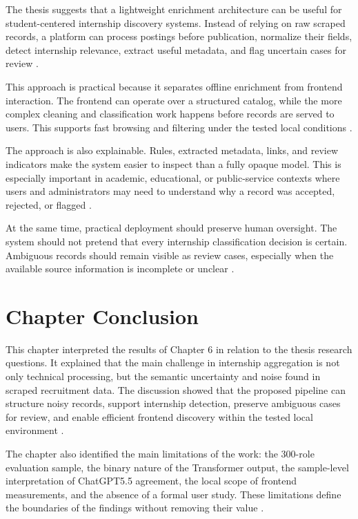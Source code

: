 The thesis suggests that a lightweight enrichment architecture can be useful for
student-centered internship discovery systems. Instead of relying on raw scraped records, a
platform can process postings before publication, normalize their fields, detect internship
relevance, extract useful metadata, and flag uncertain cases for review \cite{batini2009methodologies, doan2012principles}.

This approach is practical because it separates offline enrichment from frontend interaction.
The frontend can operate over a structured catalog, while the more complex cleaning and
classification work happens before records are served to users. This supports fast browsing
and filtering under the tested local conditions \cite{jain1991art, kleppmann2017designing}.

The approach is also explainable. Rules, extracted metadata, links, and review indicators
make the system easier to inspect than a fully opaque model. This is especially important in
academic, educational, or public-service contexts where users and administrators may need to
understand why a record was accepted, rejected, or flagged \cite{hunkenschroer2022ethics, rigotti2024fairness}.

At the same time, practical deployment should preserve human oversight. The system should
not pretend that every internship classification decision is certain. Ambiguous records should
remain visible as review cases, especially when the available source information is
incomplete or unclear \cite{krippendorff2004content}.


\section{Chapter Conclusion}

This chapter interpreted the results of Chapter 6 in relation to the thesis research questions. It
explained that the main challenge in internship aggregation is not only technical processing,
but the semantic uncertainty and noise found in scraped recruitment data. The discussion
showed that the proposed pipeline can structure noisy records, support internship detection,
preserve ambiguous cases for review, and enable efficient frontend discovery within the
tested local environment \cite{peffers2007design, wohlin2012experimentation}.

The chapter also identified the main limitations of the work: the 300-role evaluation sample,
the binary nature of the Transformer output, the sample-level interpretation of ChatGPT5.5
agreement, the local scope of frontend measurements, and the absence of a formal user study.
These limitations define the boundaries of the findings without removing their value \cite{wohlin2012experimentation, jain1991art}.

